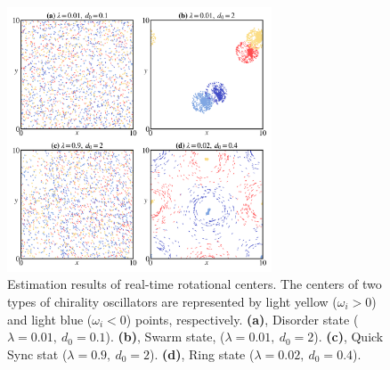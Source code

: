 \documentclass[%
 aip,
 amsmath,amssymb,
 reprint,%
]{revtex4-1}
\begin{document}
\begin{figure}
    \includegraphics[width=0.7\textwidth]{./figs/etimateCenter.png}
    \caption{
        \label{fig:etimateCenter} Estimation results of real-time rotational centers. 
        The centers of two types of chirality oscillators are represented by light yellow ($\omega_i > 0$) and light blue
        ($\omega_i < 0$) points, respectively.
        \textbf{(a)}, Disorder state ($\lambda=0.01,\ d_0=0.1$).
        \textbf{(b)}, Swarm state, ($\lambda=0.01,\ d_0=2$).
        \textbf{(c)}, Quick Sync stat ($\lambda=0.9,\ d_0=2$).
        \textbf{(d)}, Ring state ($\lambda=0.02,\ d_0=0.4$).
    }
\end{figure}
\end{document}
